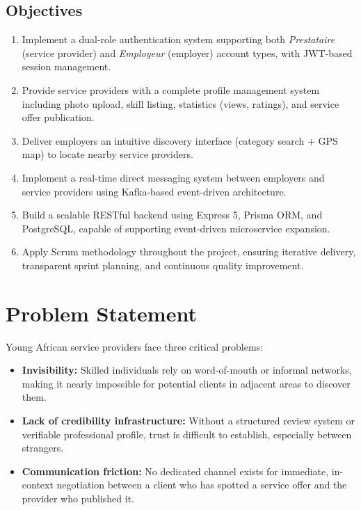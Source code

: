 \documentclass[12pt,a4paper]{report}
\begin{document}
\subsection*{Objectives}
\begin{enumerate}[label=\textbf{O\arabic*.}]
  \item Implement a dual-role authentication system supporting both \textit{Prestataire} (service provider) and \textit{Employeur} (employer) account types, with JWT-based session management.
  \item Provide service providers with a complete profile management system including photo upload, skill listing, statistics (views, ratings), and service offer publication.
  \item Deliver employers an intuitive discovery interface (category search + GPS map) to locate nearby service providers.
  \item Implement a real-time direct messaging system between employers and service providers using Kafka-based event-driven architecture.
  \item Build a scalable RESTful backend using Express 5, Prisma ORM, and PostgreSQL, capable of supporting event-driven microservice expansion.
  \item Apply Scrum methodology throughout the project, ensuring iterative delivery, transparent sprint planning, and continuous quality improvement.
\end{enumerate}

\section{Problem Statement}

Young African service providers face three critical problems:

\begin{itemize}
  \item \textbf{Invisibility:} Skilled individuals rely on word-of-mouth or informal networks, making it nearly impossible for potential clients in adjacent areas to discover them.
  \item \textbf{Lack of credibility infrastructure:} Without a structured review system or verifiable professional profile, trust is difficult to establish, especially between strangers.
  \item \textbf{Communication friction:} No dedicated channel exists for immediate, in-context negotiation between a client who has spotted a service offer and the provider who published it.
\end{itemize}
\end{document}
